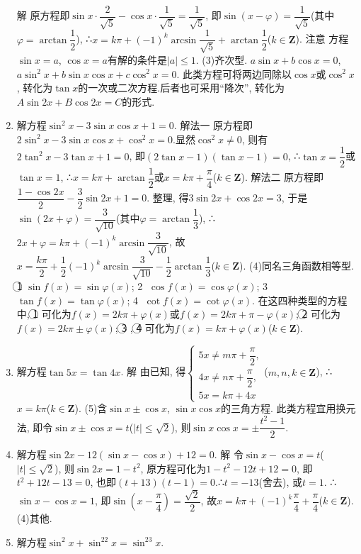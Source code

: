 \documentclass[10pt,a4paper]{article}
\begin{document}
\begin{enumerate}[1.]
解  原方程即$\sin x\cdot \dfrac 2{\sqrt 5}-\cos x\cdot \dfrac 1{\sqrt 5}=\dfrac 1{\sqrt 5}$, 即$\sin (x-\varphi)=\dfrac 1{\sqrt 5}$(其中$\varphi =\arctan \dfrac 12$),
∴$x=k\pi +(-1)^k\arcsin \dfrac 1{\sqrt 5}+\arctan \dfrac 12$($k\in \mathbf{Z}$).
注意  方程$\sin x=a$, $\cos x=a$有解的条件是$|a|\le 1$.
(3)齐次型.
$a\sin x+b\cos x=0$, $a\sin ^2x+b\sin x\cos x+c\cos ^2x=0$.
此类方程可将两边同除以$\cos x$或$\cos ^2x$, 转化为$\tan x$的一次或二次方程.后者也可采用``降次'', 转化为$A\sin 2x+B\cos 2x=C$的形式.
\item 解方程$\sin ^2x-3\sin x\cos x+1=0$.
解法一  原方程即$2\sin ^2x-3\sin x\cos x+\cos ^2x=0$.显然$\cos ^2x\ne 0$,
则有$2\tan ^2x-3\tan x+1=0$, 即$(2\tan x-1)(\tan x-1)=0$,
∴$\tan x=\dfrac 12$或$\tan x=1$, ∴$x=k\pi +\arctan \dfrac 12$或$x=k\pi +\dfrac{\pi }4$($k\in \mathbf{Z}$).
解法二  原方程即$\dfrac{1-\cos 2x}2-\dfrac 32\sin 2x+1=0$.
整理, 得$3\sin 2x+\cos 2x=3$, 于是$\sin (2x+\varphi)=\dfrac 3{\sqrt {10}}$(其中$\varphi =\arctan \dfrac 13$),
∴$2x+\varphi =k\pi +(-1)^k\arcsin \dfrac 3{\sqrt {10}}$,
故$x=\dfrac{k\pi }2+\dfrac 12(-1)^k\arcsin \dfrac 3{\sqrt {10}}-\dfrac 12\arctan \dfrac 13$($k\in \mathbf{Z}$).
(4)同名三角函数相等型.
\textcircled{1} $\sin f(x)=\sin \varphi (x)$; \textcircled{2} $\cos f(x)=\cos \varphi (x)$; \textcircled{3} $\tan f(x)=\tan \varphi (x)$; \textcircled{4} $\cot f(x)=\cot \varphi (x)$.
在这四种类型的方程中, \textcircled{1} 可化为$f(x)=2k\pi +\varphi (x)$或$f(x)=2k\pi +\pi -\varphi (x)$; \textcircled{2} 可化为$f(x)=2k\pi \pm \varphi (x)$; \textcircled{3} , \textcircled{4} 可化为$f(x)=k\pi +\varphi (x)$($k\in \mathbf{Z}$).
\item 解方程$\tan 5x=\tan 4x$.
解  由已知, 得$\begin{cases} 5x\ne m\pi +\dfrac{\pi }2, \\ 4x\ne n\pi +\dfrac{\pi }2, \\ 5x=k\pi +4x \end{cases}$($m,n,k\in \mathbf{Z}$), ∴$x=k\pi$($k\in \mathbf{Z}$).
(5)含$\sin x\pm \cos x$, $\sin x\cos x$的三角方程.
此类方程宜用换元法, 即令$\sin x\pm \cos x=t$($|t|\le \sqrt 2$), 则$\sin x\cos x=\pm \dfrac{t^2-1}2$.
\item 解方程$\sin 2x-12(\sin x-\cos x)+12=0$.
解  令$\sin x-\cos x=t$($|t|\le \sqrt 2$), 则$\sin 2x=1-t^2$, 原方程可化为$1-t^2-12t+12=0$,
即$t^2+12t-13=0$, 也即$(t+13)(t-1)=0$.∴$t=-13$(舍去), 或$t=1$.
∴$\sin x-\cos x=1$, 即$\sin (x-\dfrac{\pi }4)=\dfrac{\sqrt 2}2$, 故$x=k\pi +(-1)^k\dfrac{\pi }4+\dfrac{\pi }4$($k\in \mathbf{Z}$).
(4)其他.
\item 解方程$\sin ^2x+\sin ^22x=\sin ^23x$.

\end{enumerate}
\end{document}
